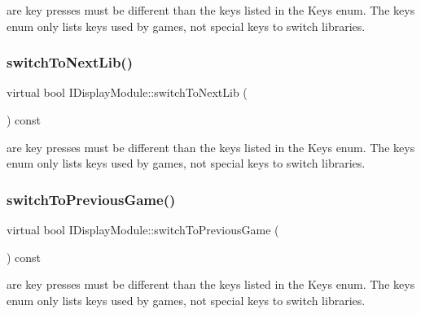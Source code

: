 are key presses must be different than the keys listed in the Keys enum. The keys enum only lists keys used by games, not special keys to switch libraries. \mbox{\label{class_i_display_module_ab5fb374a14b78037eab463b2cb1971dd}} 
\subsubsection{\texorpdfstring{switch\+To\+Next\+Lib()}{switchToNextLib()}}
{\footnotesize\ttfamily virtual bool I\+Display\+Module\+::switch\+To\+Next\+Lib (\begin{DoxyParamCaption}{ }\end{DoxyParamCaption}) const\hspace{0.3cm}{\ttfamily [pure virtual]}}

are key presses must be different than the keys listed in the Keys enum. The keys enum only lists keys used by games, not special keys to switch libraries. \mbox{\label{class_i_display_module_a09e20d4bbf16ac3aff8f62c54b4814e3}} 
\subsubsection{\texorpdfstring{switch\+To\+Previous\+Game()}{switchToPreviousGame()}}
{\footnotesize\ttfamily virtual bool I\+Display\+Module\+::switch\+To\+Previous\+Game (\begin{DoxyParamCaption}{ }\end{DoxyParamCaption}) const\hspace{0.3cm}{\ttfamily [pure virtual]}}

are key presses must be different than the keys listed in the Keys enum. The keys enum only lists keys used by games, not special keys to switch libraries. \mbox{\label{class_i_display_module_a1e23d65af2b94dda013055af15100ebe}} 
